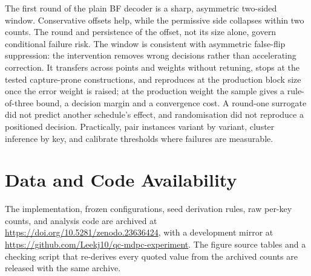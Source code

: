 \documentclass[letterpaper,journal]{IEEEtran}
\begin{document}
The first round of the plain BF decoder is a sharp, asymmetric two-sided window. Conservative offsets help, while the permissive side collapses within two counts. The round and persistence of the offset, not its size alone, govern conditional failure risk. The window is consistent with asymmetric false-flip suppression: the intervention removes wrong decisions rather than accelerating correction. It transfers across points and weights without retuning, stops at the tested capture-prone constructions, and reproduces at the production block size once the error weight is raised; at the production weight the sample gives a rule-of-three bound, a decision margin and a convergence cost. A round-one surrogate did not predict another schedule's effect, and randomisation did not reproduce a positioned decision. Practically, pair instances variant by variant, cluster inference by key, and calibrate thresholds where failures are measurable.
\section*{Data and Code Availability}
The implementation, frozen configurations, seed derivation rules, raw per-key counts, and analysis code are archived at \url{https://doi.org/10.5281/zenodo.23636424}, with a development mirror at \url{https://github.com/Leekj10/qc-mdpc-experiment}. The figure source tables and a checking script that re-derives every quoted value from the archived counts are released with the same archive.



\end{document}
